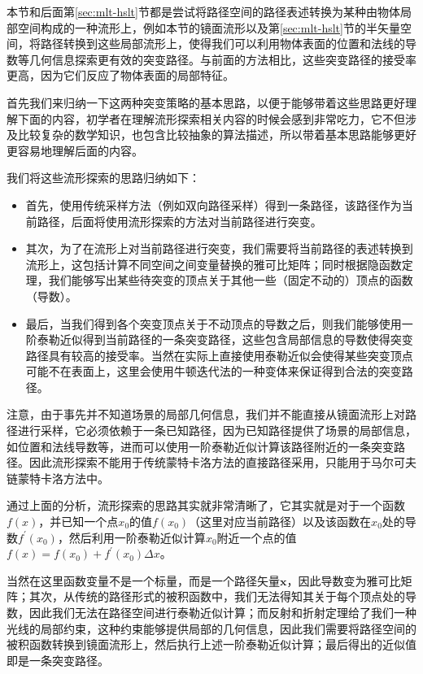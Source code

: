 本节和后面第\ref{sec:mlt-hslt}节都是尝试将路径空间的路径表述转换为某种由物体局部空间构成的一种流形上，例如本节的镜面流形以及第\ref{sec:mlt-hslt}节的半矢量空间，将路径转换到这些局部流形上，使得我们可以利用物体表面的位置和法线的导数等几何信息探索更有效的突变路径。与前面的方法相比，这些突变路径的接受率更高，因为它们反应了物体表面的局部特征。

首先我们来归纳一下这两种突变策略的基本思路，以便于能够带着这些思路更好理解下面的内容，初学者在理解流形探索相关内容的时候会感到非常吃力，它不但涉及比较复杂的数学知识，也包含比较抽象的算法描述，所以带着基本思路能够更好更容易地理解后面的内容。

我们将这些流形探索的思路归纳如下：

\begin{itemize}
	\item 首先，使用传统采样方法（例如双向路径采样）得到一条路径，该路径作为当前路径，后面将使用流形探索的方法对当前路径进行突变。
	\item 其次，为了在流形上对当前路径进行突变，我们需要将当前路径的表述转换到流形上，这包括计算不同空间之间变量替换的雅可比矩阵；同时根据隐函数定理，我们能够写出某些待突变的顶点关于其他一些（固定不动的）顶点的函数（导数）。
	\item 最后，当我们得到各个突变顶点关于不动顶点的导数之后，则我们能够使用一阶泰勒近似得到当前路径的一条突变路径，这些包含局部信息的导数使得突变路径具有较高的接受率。当然在实际上直接使用泰勒近似会使得某些突变顶点可能不在表面上，这里会使用牛顿迭代法的一种变体来保证得到合法的突变路径。
\end{itemize}

\begin{myshaded}
	注意，由于事先并不知道场景的局部几何信息，我们并不能直接从镜面流形上对路径进行采样，它必须依赖于一条已知路径，因为已知路径提供了场景的局部信息，如位置和法线导数等，进而可以使用一阶泰勒近似计算该路径附近的一条突变路径。因此流形探索不能用于传统蒙特卡洛方法的直接路径采用，只能用于马尔可夫链蒙特卡洛方法中。
\end{myshaded}

通过上面的分析，流形探索的思路其实就非常清晰了，它其实就是对于一个函数$f(x)$，并已知一个点$x_0$的值$f(x_0)$（这里对应当前路径）以及该函数在$x_0$处的导数$f^{'}(x_0)$，然后利用一阶泰勒近似计算$x_0$附近一个点的值$f(x)=f(x_0)+f^{'}(x_0)\Delta x$。

当然在这里函数变量不是一个标量，而是一个路径矢量${\mathbf{x}}$，因此导数变为雅可比矩阵；其次，从传统的路径形式的被积函数中，我们无法得知其关于每个顶点处的导数，因此我们无法在路径空间进行泰勒近似计算；而反射和折射定理给了我们一种光线的局部约束，这种约束能够提供局部的几何信息，因此我们需要将路径空间的被积函数转换到镜面流形上，然后执行上述一阶泰勒近似计算；最后得出的近似值即是一条突变路径。

